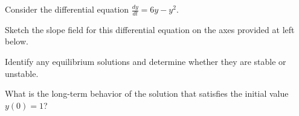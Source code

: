 \begin{activity} \label{A:7.3.2}  
Consider the differential equation
$
  \frac{dy}{dt} = 6y-y^2
$.
\ba
\item Sketch the slope field for this differential equation on the axes provided at left below.

\begin{center}
   \hspace{0.2in}  
\end{center}

\item Identify any equilibrium solutions and determine whether they
  are stable or unstable.   

\item What is the long-term behavior of the solution that satisfies the initial
  value $y(0) = 1$?


\end{activity}
